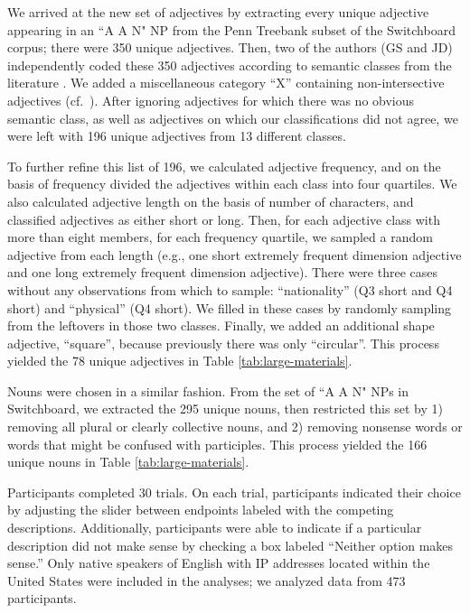 \documentclass[12pt]{article}
\begin{document}
We arrived at the new set of adjectives by extracting every unique adjective appearing in an ``A A N" NP from the Penn Treebank subset of the Switchboard corpus; there were 350 unique adjectives. Then, two of the authors (GS and JD) independently coded these 350 adjectives according to semantic classes from the literature \citep[e.g.,][]{dixon1982,Sproat1991}. We added a miscellaneous category ``X'' containing non-intersective adjectives (cf.~\citealp{Cinque2014}). After ignoring adjectives for which there was no obvious semantic class, as well as adjectives on which our classifications did not agree, we were left with 196 unique adjectives from 13 different classes.

To further refine this list of 196, we calculated adjective frequency, and on the basis of frequency divided the adjectives within each class into four quartiles. We also calculated adjective length on the basis of number of characters, and classified adjectives as either short or long. Then, for each adjective class with more than eight members, for each frequency quartile, we sampled a random adjective from each length (e.g., one short extremely frequent dimension adjective and one long extremely frequent dimension adjective). There were three cases without any observations from which to sample: ``nationality'' (Q3 short and Q4 short) and ``physical'' (Q4 short). We filled in these cases by randomly sampling from the leftovers in those two classes. Finally, we added an additional shape adjective, ``square'', because previously there was only ``circular''. This process yielded the 78 unique adjectives in Table \ref{tab:large-materials}.%

Nouns were chosen in a similar fashion. From the set of ``A A N" NPs in Switchboard, we extracted the 295 unique nouns, then restricted this set by 1) removing all plural or clearly collective nouns, and 2) removing nonsense words or words that might be confused with participles. This process yielded the 166 unique nouns in Table \ref{tab:large-materials}.

Participants completed 30 trials. On each trial, participants indicated their choice by adjusting the slider between endpoints labeled with the competing descriptions. Additionally, participants were able to indicate if a particular description did not make sense by checking a box labeled ``Neither option makes sense.'' Only native speakers of English with IP addresses located within the United States were included in the analyses; we analyzed data from 473 participants.
\end{document}
